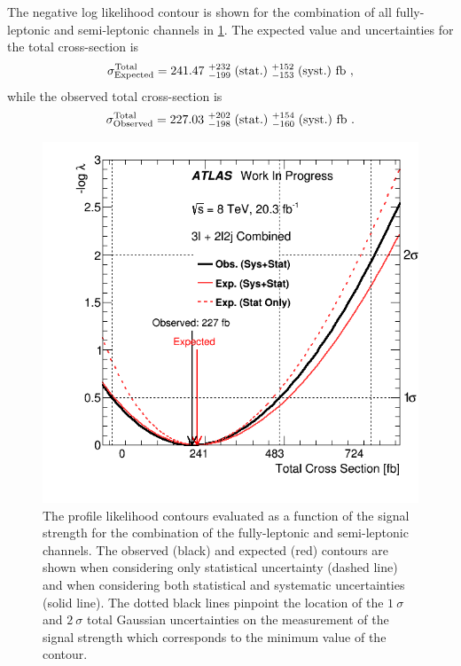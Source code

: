 The negative log likelihood contour is shown
for the combination of all fully-leptonic and semi-leptonic channels in 
\fig\ref{fig:stat_measurement_interval_combination}.
The expected value and uncertainties for the total cross-section is
\begin{equation}
\sigma^{\textrm{Total}}_{\textrm{Expected}} = 241.47 ~ ^{+232}_{-199} \mbox{$\;$(stat.)} ~^{+152}_{-153}\mbox{$\;$(syst.)} ~\textrm{fb} ~, 
\end{equation}
while the observed total cross-section is
\begin{equation}
\sigma^{\textrm{Total}}_{\textrm{Observed}} = 227.03 ~ ^{+202}_{-198} \mbox{$\;$(stat.)} ~^{+154}_{-160} \mbox{$\;$(syst.)} ~\textrm{fb} ~.
\end{equation}


\begin{figure}[ht!]
\centering
\includegraphics[width=.8\textwidth]{figures/combination/interval_comb.png}
\caption{The profile likelihood contours evaluated as a function of the signal strength
for the combination of the fully-leptonic and semi-leptonic channels. 
The observed (black) and expected (red) contours are shown when considering only statistical uncertainty (dashed line) and when considering both statistical and systematic uncertainties (solid line).
The dotted black
lines pinpoint the location of the $1~\sigma$ and $2~\sigma$ total Gaussian uncertainties
on the measurement of the signal strength which corresponds to the minimum value of the contour.}
\label{fig:stat_measurement_interval_combination}
\end{figure}







